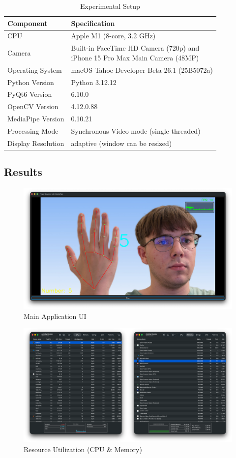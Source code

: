 \documentclass{article}
\begin{document}
\begin{table}[H]
	\centering
	\begin{tabular}{|l|l|}
		\hline
		\textbf{Component} & \textbf{Specification} \\\hline
		CPU & Apple M1 (8-core, 3.2 GHz) \\\hline
		Camera & \makecell[l]{Built-in FaceTime HD Camera (720p) and\\ iPhone 15 Pro Max Main Camera (48MP)} \\\hline
		Operating System & macOS Tahoe Developer Beta 26.1 (25B5072a) \\\hline
		Python Version & Python 3.12.12 \\\hline
		PyQt6 Version & 6.10.0\\\hline
		OpenCV Version & 4.12.0.88 \\\hline
		MediaPipe Version & 0.10.21 \\\hline
		Processing Mode & Synchronous Video mode (single threaded) \\\hline
		Display Resolution & adaptive (window can be resized) \\\hline
	\end{tabular}
	\caption{Experimental Setup}
\end{table}

\subsection{Results}

\begin{figure}[H]
	\centering
	\includegraphics[width=12cm]{ui.png}
	\caption{Main Application UI}
\end{figure}

\begin{figure}[H]
	\centering
	\includegraphics[width=12cm]{resource_utilization.png}
	\caption{Resource Utilization (CPU \& Memory)}
\end{figure}
\end{document}
